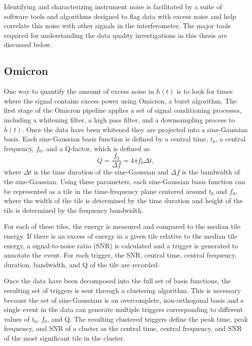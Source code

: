 Identifying and characterizing instrument noise is facilitated by a 
suite of software tools and algorithms designed to flag data with 
excess noise and help correlate this noise with other signals in the 
interferometer. The major tools required for understanding the data 
quality investigations in this thesis are discussed below. 

\subsection{Omicron}

One way to quantify the amount of excess noise in $h(t)$ is to look 
for times where the signal contains excess power using 
Omicron, a burst algorithm. 
The first stage of the Omicron pipeline applies a set of signal conditioning 
processes, including a whitening filter, a high pass filter, and a downsampling 
process to $h(t)$. Once the data have been whitened they are projected into 
a sine-Gaussian basis. Each sine-Gaussian basis function is defined 
by a central time, $t_0$, a central frequency, $f_0$, and a Q-factor, 
which is defined as \cite{McIverThesis}  
\begin{equation}
Q = \frac{f_0}{\Delta f} = 4\pi f_0 \Delta t,
\end{equation} 
where $\Delta t$ is the time duration of the sine-Gaussian and 
$\Delta f$ is the bandwidth of the sine-Gaussian. Using these parameters, 
each sine-Gaussian basis function can be represented as a tile in the 
time-frequency plane centered around $t_0$ and $f_0$, where the width of 
the tile is determined by the time duration 
and height of the tile is determined by the frequency bandwidth. 

For each 
of these tiles, the energy is measured and compared to the median tile 
energy. If there is an excess of energy in a given tile relative to the 
median tile energy, a signal-to-noise ratio (SNR) is calculated and a trigger 
is generated to annotate the event. For each trigger, the SNR, central time, 
central frequency, duration, bandwidth, and Q of the tile are recorded. 

Once the data have been decomposed into the full set of basis functions, the 
resulting set of triggers is sent through a clustering algorithm. This is 
necessary because the set of sine-Gaussians is an overcomplete, 
non-orthogonal basis and a single event in the data can generate multiple 
triggers corresponding to different values of $t_0$, $f_0$, and Q. The 
resulting clustered triggers define the peak time, peak frequency, and 
SNR of a cluster as the central time, central frequency, and SNR of the 
most significant tile in the cluster. 

